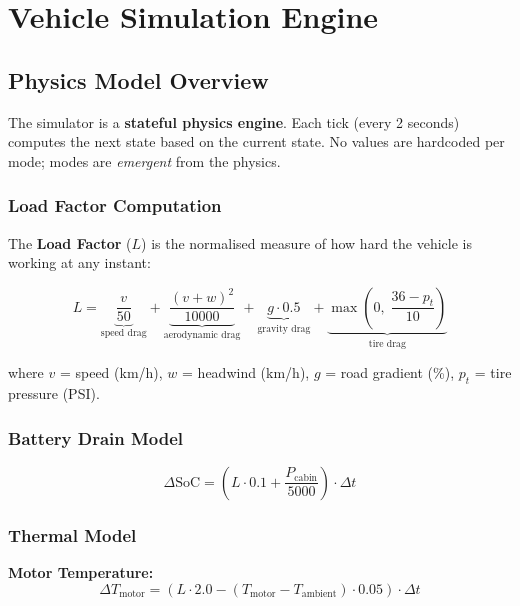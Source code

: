 \documentclass[12pt,a4paper]{report}
\begin{document}
\chapter{Vehicle Simulation Engine}

\section{Physics Model Overview}

The simulator is a \textbf{stateful physics engine}. Each tick (every 2 seconds) computes the next state based on the current state. No values are hardcoded per mode; modes are \textit{emergent} from the physics.

\subsection{Load Factor Computation}

The \textbf{Load Factor} ($L$) is the normalised measure of how hard the vehicle is working at any instant:

\begin{equation}
L = \underbrace{\frac{v}{50}}_{\text{speed drag}} + \underbrace{\frac{(v + w)^2}{10000}}_{\text{aerodynamic drag}} + \underbrace{g \cdot 0.5}_{\text{gravity drag}} + \underbrace{\max\!\left(0,\; \frac{36 - p_t}{10}\right)}_{\text{tire drag}}
\label{eq:load}
\end{equation}

where $v$ = speed (km/h), $w$ = headwind (km/h), $g$ = road gradient (\%), $p_t$ = tire pressure (PSI).

\subsection{Battery Drain Model}

\begin{equation}
\Delta \text{SoC} = \left(L \cdot 0.1 + \frac{P_{\text{cabin}}}{5000}\right) \cdot \Delta t
\label{eq:drain}
\end{equation}

\subsection{Thermal Model}

\textbf{Motor Temperature:}
\begin{equation}
\Delta T_{\text{motor}} = (L \cdot 2.0 - (T_{\text{motor}} - T_{\text{ambient}}) \cdot 0.05) \cdot \Delta t
\label{eq:motor-temp}
\end{equation}
\end{document}
